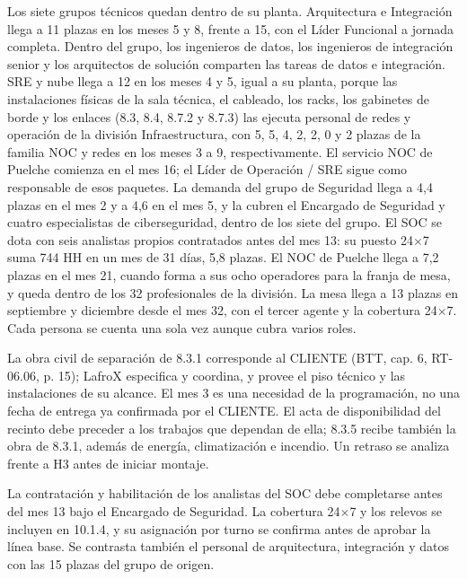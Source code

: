 
Los siete grupos técnicos quedan dentro de su planta. Arquitectura e Integración llega a 11 plazas en los meses 5 y 8, frente a 15, con el Líder Funcional a jornada completa. Dentro del grupo, los ingenieros de datos, los ingenieros de integración senior y los arquitectos de solución comparten las tareas de datos e integración. SRE y nube llega a 12 en los meses 4 y 5, igual a su planta, porque las instalaciones físicas de la sala técnica, el cableado, los racks, los gabinetes de borde y los enlaces (8.3, 8.4, 8.7.2 y 8.7.3) las ejecuta personal de redes y operación de la división Infraestructura, con 5, 5, 4, 2, 2, 0 y 2 plazas de la familia NOC y redes en los meses 3 a 9, respectivamente. El servicio NOC de Puelche comienza en el mes 16; el Líder de Operación / SRE sigue como responsable de esos paquetes. La demanda del grupo de Seguridad llega a 4,4 plazas en el mes 2 y a 4,6 en el mes 5, y la cubren el Encargado de Seguridad y cuatro especialistas de ciberseguridad, dentro de los siete del grupo. El SOC se dota con seis analistas propios contratados antes del mes 13: su puesto 24\ensuremath{\times}7 suma 744 HH en un mes de 31 días, 5,8 plazas. El NOC de Puelche llega a 7,2 plazas en el mes 21, cuando forma a sus ocho operadores para la franja de mesa, y queda dentro de los 32 profesionales de la división. La mesa llega a 13 plazas en septiembre y diciembre desde el mes 32, con el tercer agente y la cobertura 24\ensuremath{\times}7. Cada persona se cuenta una sola vez aunque cubra varios roles.

La obra civil de separación de 8.3.1 corresponde al CLIENTE (BTT, cap. 6, RT-06.06, p. 15); LafroX especifica y coordina, y provee el piso técnico y las instalaciones de su alcance. El mes 3 es una necesidad de la programación, no una fecha de entrega ya confirmada por el CLIENTE. El acta de disponibilidad del recinto debe preceder a los trabajos que dependan de ella; 8.3.5 recibe también la obra de 8.3.1, además de energía, climatización e incendio. Un retraso se analiza frente a H3 antes de iniciar montaje.

La contratación y habilitación de los analistas del SOC debe completarse antes del mes 13 bajo el Encargado de Seguridad. La cobertura 24\ensuremath{\times}7 y los relevos se incluyen en 10.1.4, y su asignación por turno se confirma antes de aprobar la línea base. Se contrasta también el personal de arquitectura, integración y datos con las 15 plazas del grupo de origen.

